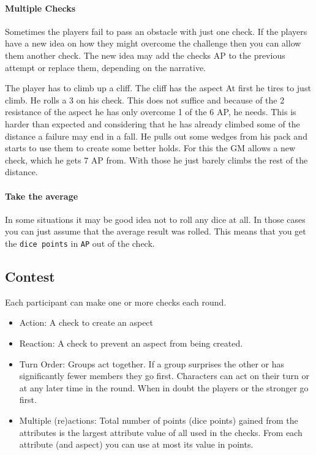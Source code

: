 \documentclass[11pt]{article}
\begin{document}
{\paragraph*{Multiple Checks}
\label{sec:org770f984}
Sometimes the players fail to pass an obstacle with just one check. If the players have a new idea on how they might overcome the challenge then you can allow them another check. The new idea may add the checks AP to the previous attempt or replace them, depending on the narrative.

\begin{pwexample}
The player has to climb up a cliff. The cliff has the aspect  At first he tires to just climb. He rolls a 3 on his check. This does not suffice and because of the 2 resistance of the aspect he has only overcome 1 of the 6 AP, he needs. This is harder than expected and considering that he has already climbed some of the distance a failure may end in a fall. He pulls out some wedges from his pack and starts to use them to create some better holds. For this the GM allows a new check, which he gets 7 AP from. With those he just barely climbs the rest of the distance.
\end{pwexample}
\paragraph*{Take the average}
\label{sec:orgff010a7}
In some situations it may be good idea not to roll any dice at all. In those cases you can just assume that the average result was rolled. This means that you get the \texttt{dice points} in \texttt{AP} out of the check. 
\subsection{Contest}
\label{sec:org2a6e3a0}
\begin{short}
Each participant can make one or more checks each round.
\begin{itemize}
\item Action: A check to create an aspect
\item Reaction: A check to prevent an aspect from being created.
\item Turn Order: Groups act together. If a group surprises the other or has significantly fewer members they go first. Characters can act on their turn or at any later time in the round. When in doubt the players or the stronger go first.
\item Multiple (re)actions: Total number of points (dice points) gained from the attributes is the largest attribute value of all used in the checks. From each attribute (and aspect) you can use at most its value in points.
\end{itemize}
\end{short}

}
\end{document}
